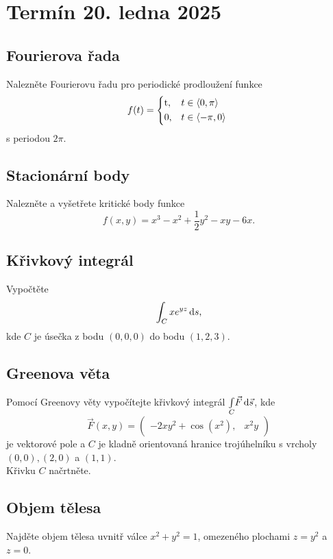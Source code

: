 \section{Termín 20. ledna 2025}

\subsection{Fourierova řada}
Nalezněte Fourierovu řadu pro periodické prodloužení funkce
\[
    f(t)=
    \begin{cases*}
        $t$, & $t \in \langle 0, \pi \rangle$ \\
        $0$, & $t \in \langle -\pi, 0 \rangle$
    \end{cases*}
\]
s periodou $2 \pi$.

\subsection{Stacionární body}
Nalezněte a vyšetřete kritické body funkce
\[
    f(x, y) = x^3 - x^2 + \frac{1}{2} y^2 - xy - 6x \text{.}
\]

\subsection{Křivkový integrál}
Vypočtěte
\[
    \int_{C} x e^{yz} \mathop{}\!\mathrm{d} s \text{,}
\]
kde $C$ je úsečka z bodu $(0, 0, 0)$ do bodu $(1, 2, 3)$.

\subsection{Greenova věta}
Pomocí Greenovy věty vypočítejte křivkový integrál $\underset{C}{\int} \vec{F} \mathop{}\!\mathrm{d} \vec{s}$, kde
\[
    \vec{F}(x,y) =
    \begin{pmatrix}
        -2xy^2 + \cos(x^2), & x^2 y
    \end{pmatrix}
\]
je vektorové pole a $C$ je kladně orientovaná hranice trojúhelníku s vrcholy $(0, 0), (2, 0)$ a $(1, 1)$. \\
Křivku $C$ načrtněte.

\subsection{Objem tělesa}
Najděte objem tělesa uvnitř válce $x^2 + y^2 = 1$, omezeného plochami $z=y^2$ a $z=0$.
